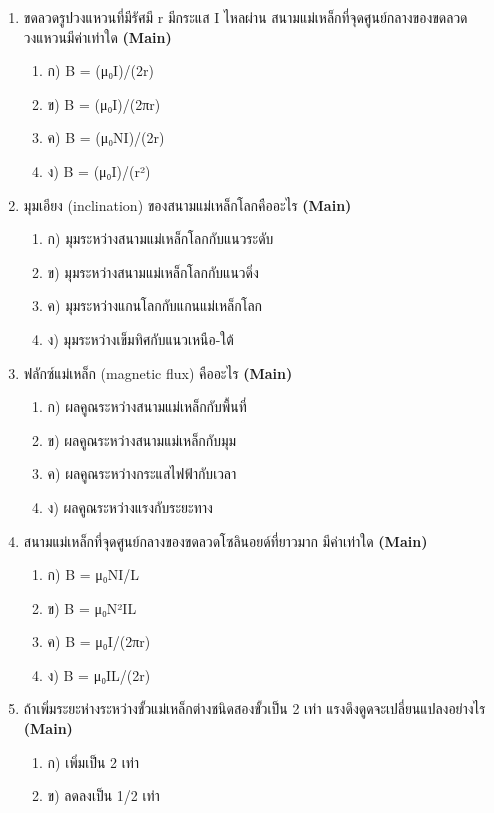 \documentclass[12pt]{article}
\begin{document}
\begin{enumerate}[label=\arabic*.]
\begin{enumerate}[label=)]
\end{enumerate}
\item ขดลวดรูปวงแหวนที่มีรัศมี r มีกระแส I ไหลผ่าน สนามแม่เหล็กที่จุดศูนย์กลางของขดลวดวงแหวนมีค่าเท่าใด \hfill \textbf{\small (Main)}
\begin{enumerate}[label=)]
\item ก) B = (μ₀I)/(2r)
\item ข) B = (μ₀I)/(2πr)
\item ค) B = (μ₀NI)/(2r)
\item ง) B = (μ₀I)/(r²)
\end{enumerate}
\item มุมเอียง (inclination) ของสนามแม่เหล็กโลกคืออะไร \hfill \textbf{\small (Main)}
\begin{enumerate}[label=)]
\item ก) มุมระหว่างสนามแม่เหล็กโลกกับแนวระดับ
\item ข) มุมระหว่างสนามแม่เหล็กโลกกับแนวดิ่ง
\item ค) มุมระหว่างแกนโลกกับแกนแม่เหล็กโลก
\item ง) มุมระหว่างเข็มทิศกับแนวเหนือ-ใต้
\end{enumerate}
\item ฟลักซ์แม่เหล็ก (magnetic flux) คืออะไร \hfill \textbf{\small (Main)}
\begin{enumerate}[label=)]
\item ก) ผลคูณระหว่างสนามแม่เหล็กกับพื้นที่
\item ข) ผลคูณระหว่างสนามแม่เหล็กกับมุม
\item ค) ผลคูณระหว่างกระแสไฟฟ้ากับเวลา
\item ง) ผลคูณระหว่างแรงกับระยะทาง
\end{enumerate}
\item สนามแม่เหล็กที่จุดศูนย์กลางของขดลวดโซลินอยด์ที่ยาวมาก มีค่าเท่าใด \hfill \textbf{\small (Main)}
\begin{enumerate}[label=)]
\item ก) B = μ₀NI/L
\item ข) B = μ₀N²IL
\item ค) B = μ₀I/(2πr)
\item ง) B = μ₀IL/(2r)
\end{enumerate}
\item ถ้าเพิ่มระยะห่างระหว่างขั้วแม่เหล็กต่างชนิดสองขั้วเป็น 2 เท่า แรงดึงดูดจะเปลี่ยนแปลงอย่างไร \hfill \textbf{\small (Main)}
\begin{enumerate}[label=)]
\item ก) เพิ่มเป็น 2 เท่า
\item ข) ลดลงเป็น 1/2 เท่า

\end{enumerate}
\end{enumerate}
\end{document}
